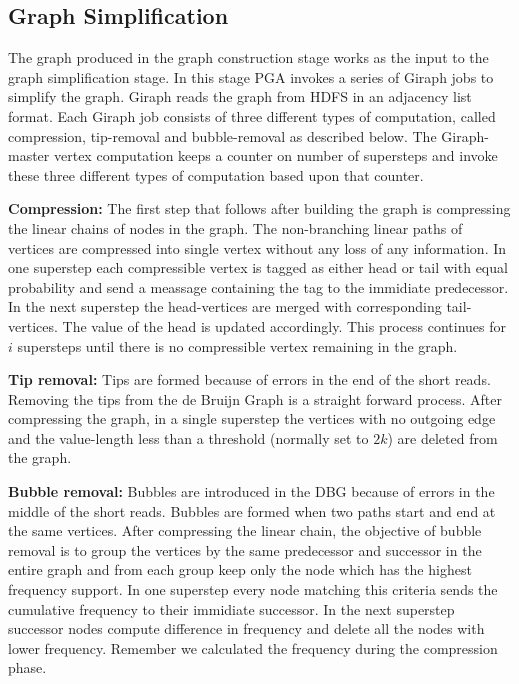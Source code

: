 \documentclass[conference]{IEEEtran}
\begin{document}
\subsection {Graph Simplification}
The graph produced in the graph construction stage works as the input to the graph simplification stage.
In this stage PGA invokes a series of Giraph jobs to simplify the graph.
Giraph reads the graph from HDFS in an adjacency list format.
Each Giraph job consists of three different types of computation, called compression, tip-removal and bubble-removal as described below.
The Giraph-master vertex computation keeps a counter on number of supersteps and invoke these three different types of computation based upon that counter.
 
\textbf{Compression:} The first step that follows after building the graph is compressing the linear chains of nodes in the graph.
The non-branching linear paths of vertices are compressed into single vertex without any loss of any information.
In one superstep each compressible vertex is tagged as either head or tail with equal probability and send a meassage containing the tag to the immidiate predecessor.
In the next superstep the head-vertices are merged with corresponding tail-vertices.
The value of the head is updated accordingly. 
This process continues for $i$ supersteps until there is no compressible vertex remaining in the graph.

\textbf{Tip removal:} Tips are formed because of errors in the end of the short reads.
Removing the tips from the de Bruijn Graph is a straight forward process.
After compressing the graph, in a single superstep the vertices with no outgoing edge and the value-length less than a threshold (normally set to $2k$) are deleted from the graph.

\textbf{Bubble removal:} Bubbles are introduced in the DBG because of errors in the middle of the short reads.
Bubbles are formed when two paths start and end at the same vertices.
After compressing the linear chain, the objective of bubble removal is to group the vertices by the same predecessor and successor in the entire graph and from each group keep only the node which has the highest frequency support.
In one superstep every node matching this criteria sends the cumulative frequency to their immidiate successor.
In the next superstep successor nodes compute difference in frequency and delete all the nodes with lower frequency.
Remember we calculated the frequency during the compression phase.
\end{document}
